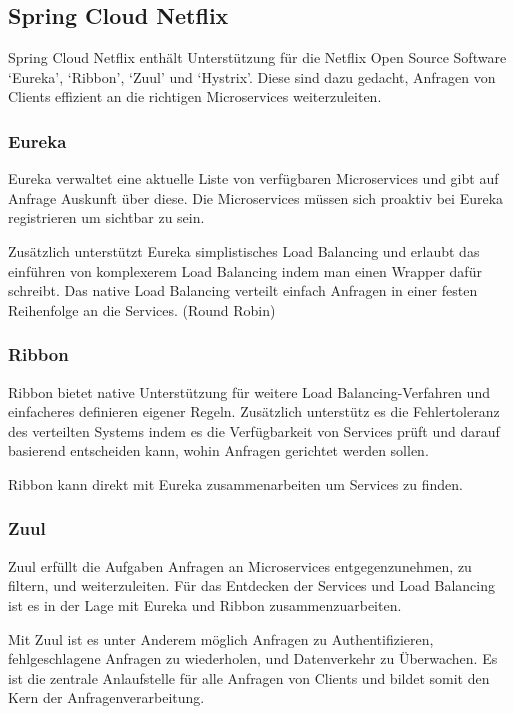 \documentclass{article}
\begin{document}
\subsection{Spring Cloud Netflix}

Spring Cloud Netflix enthält Unterstützung für die Netflix Open Source Software `Eureka', `Ribbon', `Zuul' und `Hystrix'.
Diese sind dazu gedacht, Anfragen von Clients effizient an die richtigen Microservices weiterzuleiten.

\subsubsection{Eureka}

Eureka verwaltet eine aktuelle Liste von verfügbaren Microservices und gibt auf Anfrage Auskunft über diese.
Die Microservices müssen sich proaktiv bei Eureka registrieren um sichtbar zu sein.

Zusätzlich unterstützt Eureka simplistisches Load Balancing und erlaubt das einführen von komplexerem Load Balancing indem man einen Wrapper dafür schreibt.
Das native Load Balancing verteilt einfach Anfragen in einer festen Reihenfolge an die Services. (Round Robin)

\subsubsection{Ribbon}

Ribbon bietet native Unterstützung für weitere Load Balancing-Verfahren und einfacheres definieren eigener Regeln.
Zusätzlich unterstütz es die Fehlertoleranz des verteilten Systems indem es die Verfügbarkeit von Services prüft und darauf basierend entscheiden kann, wohin Anfragen gerichtet werden sollen.

Ribbon kann direkt mit Eureka zusammenarbeiten um Services zu finden.

\subsubsection{Zuul}

Zuul erfüllt die Aufgaben Anfragen an Microservices entgegenzunehmen, zu filtern, und weiterzuleiten.
Für das Entdecken der Services und Load Balancing ist es in der Lage mit Eureka und Ribbon zusammenzuarbeiten.

Mit Zuul ist es unter Anderem möglich Anfragen zu Authentifizieren, fehlgeschlagene Anfragen zu wiederholen, und Datenverkehr zu Überwachen.
Es ist die zentrale Anlaufstelle für alle Anfragen von Clients und bildet somit den Kern der Anfragenverarbeitung.
\end{document}
